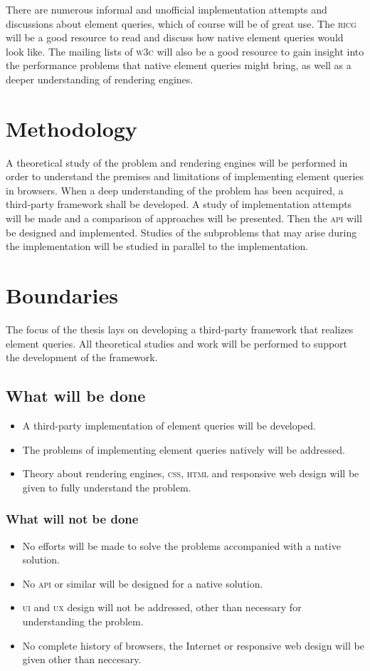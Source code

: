 \documentclass[oneside,a4paper,11pt]{kth-mag}
\begin{document}
There are numerous informal and unofficial implementation attempts and discussions about element queries, which of course will be of great use.
The \textsc{ricg} will be a good resource to read and discuss how native element queries would look like.
The mailing lists of \textsc{w3c} will also be a good resource to gain insight into the performance problems that native element queries might bring, as well as a deeper understanding of rendering engines.

\section*{Methodology}
A theoretical study of the problem and rendering engines will be performed in order to understand the premises and limitations of implementing element queries in browsers.
When a deep understanding of the problem has been acquired, a third-party framework shall be developed.
A study of implementation attempts will be made and a comparison of approaches will be presented.
Then the \textsc{api} will be designed and implemented.
Studies of the subproblems that may arise during the implementation will be studied in parallel to the implementation.

\section*{Boundaries}
The focus of the thesis lays on developing a third-party framework that realizes element queries.
All theoretical studies and work will be performed to support the development of the framework.

\subsection*{What will be done}
\begin{itemize}
\item A third-party implementation of element queries will be developed.
\item The problems of implementing element queries natively will be addressed.
\item Theory about rendering engines, \textsc{css}, \textsc{html} and responsive web design will be given to fully understand the problem.
\end{itemize}

\subsubsection*{What will not be done}
\begin{itemize}
\item No efforts will be made to solve the problems accompanied with a native solution.
\item No \textsc{api} or similar will be designed for a native solution.
\item \textsc{ui} and \textsc{ux} design will not be addressed, other than necessary for understanding the problem.
\item No complete history of browsers, the Internet or responsive web design will be given other than neccesary.
\end{itemize}
\end{document}
